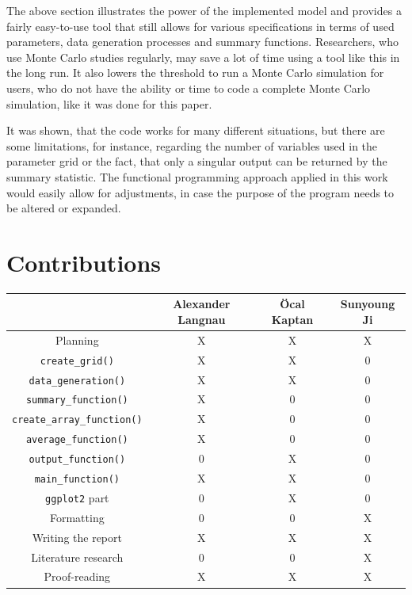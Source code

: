 \documentclass[11pt,a4paper]{article}
\begin{document}
The above section illustrates the power of the implemented model and
provides a fairly easy-to-use tool that still allows for various
specifications in terms of used parameters, data generation processes
and summary functions. Researchers, who use Monte Carlo studies
regularly, may save a lot of time using a tool like this in the long
run. It also lowers the threshold to run a Monte Carlo simulation for
users, who do not have the ability or time to code a complete Monte
Carlo simulation, like it was done for this paper.

It was shown, that the code works for many different situations, but
there are some limitations, for instance, regarding the number of
variables used in the parameter grid or the fact, that only a singular
output can be returned by the summary statistic. The functional
programming approach applied in this work would easily allow for
adjustments, in case the purpose of the program needs to be altered or
expanded.

\pagebreak

\hypertarget{contributions}{%
\section{Contributions}\label{contributions}}

\begin{longtable}[]{@{}cccc@{}}
\toprule()
& Alexander Langnau & Öcal Kaptan & Sunyoung Ji \\
\midrule()
\endhead
Planning & X & X & X \\
\texttt{create\_grid()} & X & X & 0 \\
\texttt{data\_generation()} & X & X & 0 \\
\texttt{summary\_function()} & X & 0 & 0 \\
\texttt{create\_array\_function()} & X & 0 & 0 \\
\texttt{average\_function()} & X & 0 & 0 \\
\texttt{output\_function()} & 0 & X & 0 \\
\texttt{main\_function()} & X & X & 0 \\
\texttt{ggplot2} part & 0 & X & 0 \\
Formatting & 0 & 0 & X \\
Writing the report & X & X & X \\
Literature research & 0 & 0 & X \\
Proof-reading & X & X & X \\
\bottomrule()
\end{longtable}
\end{document}
